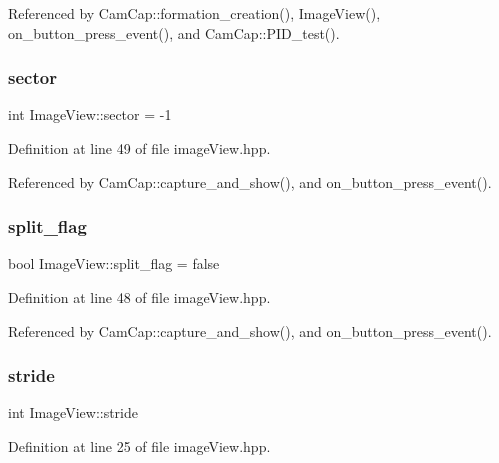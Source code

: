 Referenced by Cam\+Cap\+::formation\+\_\+creation(), Image\+View(), on\+\_\+button\+\_\+press\+\_\+event(), and Cam\+Cap\+::\+P\+I\+D\+\_\+test().

\mbox{\label{class_image_view_a0a5a7071e17e23864058b755b515e9ab}} 
\subsubsection{\texorpdfstring{sector}{sector}}
{\footnotesize\ttfamily int Image\+View\+::sector = -\/1}



Definition at line 49 of file image\+View.\+hpp.



Referenced by Cam\+Cap\+::capture\+\_\+and\+\_\+show(), and on\+\_\+button\+\_\+press\+\_\+event().

\mbox{\label{class_image_view_af347599c5ea679b8ed0ca867f3a942c5}} 
\subsubsection{\texorpdfstring{split\+\_\+flag}{split\_flag}}
{\footnotesize\ttfamily bool Image\+View\+::split\+\_\+flag = false}



Definition at line 48 of file image\+View.\+hpp.



Referenced by Cam\+Cap\+::capture\+\_\+and\+\_\+show(), and on\+\_\+button\+\_\+press\+\_\+event().

\mbox{\label{class_image_view_aee8be5a0041dbc9c04cdc439d08cc3df}} 
\subsubsection{\texorpdfstring{stride}{stride}}
{\footnotesize\ttfamily int Image\+View\+::stride}



Definition at line 25 of file image\+View.\+hpp.



